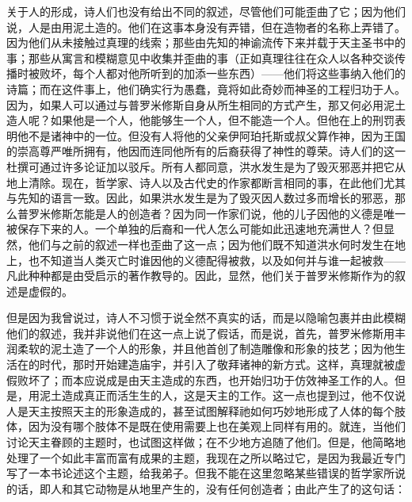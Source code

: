 关于人的形成，诗人们也没有给出不同的叙述，尽管他们可能歪曲了它；因为他们说，人是由用泥土造的。他们在这事本身没有弄错，但在造物者的名称上弄错了。因为他们从未接触过真理的线索；那些由先知的神谕流传下来并载于天主圣书中的事；那些从寓言和模糊意见中收集并歪曲的事（正如真理往往在众人以各种交谈传播时被败坏，每个人都对他所听到的加添一些东西）——他们将这些事纳入他们的诗篇；而在这件事上，他们确实行为愚蠢，竟将如此奇妙而神圣的工程归功于人。因为，如果人可以通过与普罗米修斯自身从所生相同的方式产生，那又何必用泥土造人呢？如果他是一个人，他能够生一个人，但不能造一个人。但他在上的刑罚表明他不是诸神中的一位。但没有人将他的父亲伊阿珀托斯或叔父算作神，因为王国的崇高尊严唯所拥有，他因而连同他所有的后裔获得了神性的尊荣。诗人们的这一杜撰可通过许多论证加以驳斥。所有人都同意，洪水发生是为了毁灭邪恶并把它从地上清除。现在，哲学家、诗人以及古代史的作家都断言相同的事，在此他们尤其与先知的语言一致。因此，如果洪水发生是为了毁灭因人数过多而增长的邪恶，那么普罗米修斯怎能是人的创造者？因为同一作家们说，他的儿子因他的义德是唯一被保存下来的人。一个单独的后裔和一代人怎么可能如此迅速地充满世人？但显然，他们与之前的叙述一样也歪曲了这一点；因为他们既不知道洪水何时发生在地上，也不知道当人类灭亡时谁因他的义德配得被救，以及如何并与谁一起被救——凡此种种都是由受启示的著作教导的。因此，显然，他们关于普罗米修斯作为的叙述是虚假的。\par

但是因为我曾说过，诗人不习惯于说全然不真实的话，而是以隐喻包裹并由此模糊他们的叙述，我并非说他们在这一点上说了假话，而是说，首先，普罗米修斯用丰润柔软的泥土造了一个人的形象，并且他首创了制造雕像和形象的技艺；因为他生活在的时代，那时开始建造庙宇，并引入了敬拜诸神的新方式。这样，真理就被虚假败坏了；而本应说成是由天主造成的东西，也开始归功于仿效神圣工作的人。但是，用泥土造成真正而活生生的人，这是天主的工作。这一点也提到过，他不仅说人是天主按照天主的形象造成的，甚至试图解释祂如何巧妙地形成了人体的每个肢体，因为没有哪个肢体不是既在使用需要上也在美观上同样有用的。就连，当他们讨论天主眷顾的主题时，也试图这样做；在不少地方追随了他们。但是，他简略地处理了一个如此丰富而富有成果的主题，我现在之所以略过它，是因为我最近专门写了一本书论述这个主题，给我弟子。但我不能在这里忽略某些错误的哲学家所说的话，即人和其它动物是从地里产生的，没有任何创造者；由此产生了的这句话：\par

